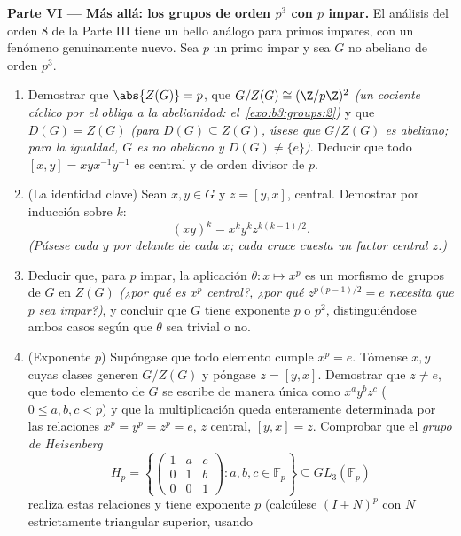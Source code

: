 \begin{problem}
\medskip
\noindent\textbf{Parte VI --- Más allá: los grupos de orden $p^3$ con
$p$ impar.} El análisis del orden $8$ de la Parte III tiene un bello
análogo para primos impares, con un fenómeno genuinamente nuevo. Sea $p$
un primo impar y sea $G$ no abeliano de orden $p^3$.
\begin{enumerate}[resume]
  \item Demostrar que $\abs{Z(G)} = p$, que $G/Z(G) \cong
        (\Z/p\Z)^2$ \emph{(un cociente cíclico por el
   obliga a la abelianidad:
  el~\cref{exo:b3:groups:2})} y que $D(G) =
        Z(G)$ \emph{(para $D(G) \subseteq Z(G)$, úsese que $G/Z(G)$ es
  abeliano; para la igualdad, $G$ es no abeliano y $D(G) \neq \{e\}$)}.
  Deducir que todo 
  $[x, y] = xyx^{-1}y^{-1}$ es central y de orden divisor de $p$. \item
  (La identidad clave) Sean $x, y \in G$ y $z = [y, x]$, central.
  Demostrar por inducción sobre $k$:
        \[
        (xy)^k = x^k y^k z^{k(k-1)/2} .
        \]
        \emph{(Pásese cada $y$ por delante de cada $x$; cada cruce
        cuesta un factor central $z$.)} \item Deducir que, para $p$
        impar, la aplicación $\theta\colon x \mapsto
        x^p$ es un morfismo de grupos de $G$ en $Z(G)$ \emph{(¿por qué
        es $x^p$ central?, ¿por qué $z^{p(p-1)/2} = e$ necesita que $p$
        sea impar?)}, y concluir que $G$ tiene exponente $p$ o $p^2$,
        distinguiéndose ambos casos según que $\theta$ sea trivial o no.
        \item (Exponente $p$) Supóngase que todo elemento cumple
        $x^p = e$. Tómense $x, y$ cuyas clases generen $G/Z(G)$ y
        póngase $z =
        [y, x]$. Demostrar que $z \neq e$, que todo elemento de $G$ se
        escribe de manera única como $x^ay^bz^c$ ($0 \leq a, b, c < p$)
        y que la multiplicación queda enteramente determinada por las
        relaciones $x^p = y^p = z^p = e$, $z$ central, $[y, x] =
        z$. Comprobar que el \emph{grupo de Heisenberg}
        \[
        H_p = \left\{
        \begin{pmatrix} 1 & a & c\\ 0 & 1 & b\\ 0 & 0 & 1
        \end{pmatrix} : a, b, c \in \mathbb F_p \right\}
        \subseteq GL_3(\mathbb F_p)
        \]
        realiza estas relaciones y tiene exponente $p$ (calcúlese
        $(I + N)^p$ con $N$ estrictamente triangular superior, usando

\end{enumerate}
\end{problem}
